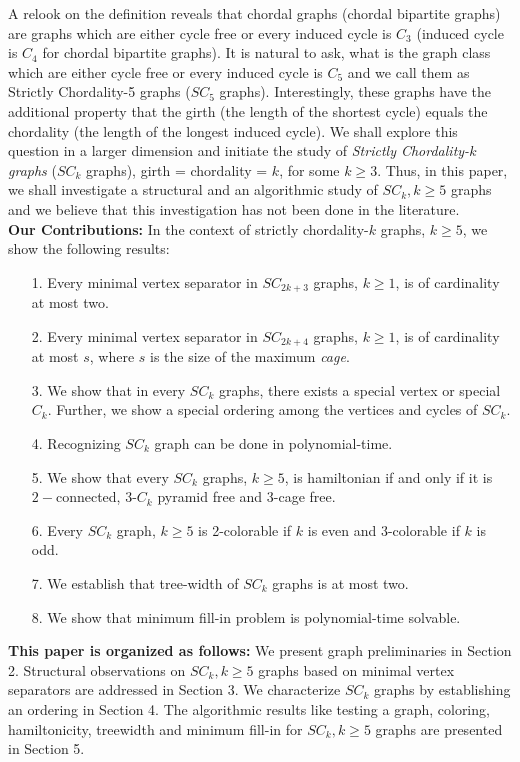 \documentclass[runningheads]{llncs}
\begin{document}
A relook on the definition reveals that chordal graphs (chordal bipartite graphs) are graphs which are either cycle free or every induced cycle is $C_3$ (induced cycle is $C_4$ for chordal bipartite graphs). It is natural to ask, what is the graph class which are either cycle free or every induced cycle is $C_5$ and we call them as Strictly Chordality-5 graphs ($SC_5$ graphs). Interestingly, these graphs have the additional property that the girth (the length of the shortest cycle) equals the chordality (the length of the longest induced cycle). We shall explore this question in a larger dimension and initiate the study of \emph{Strictly Chordality-$k$ graphs} ($SC_k$ graphs), girth = chordality = $k$, for some $k \geq 3$. Thus, in this paper, we shall investigate a structural and an algorithmic study of $SC_k, k \geq 5$ graphs and we believe that this investigation has not been done in the literature.\\
\textbf{Our Contributions:} In the context of strictly chordality-$k$ graphs, $k \geq 5$, we show the following results: 
\begin{itemize}
\item[1.] Every minimal vertex separator in $SC_{2k+3}$ graphs, $k\geq 1$, is of cardinality at most two.
\item[2.] Every minimal vertex separator in $SC_{2k+4}$ graphs, $k\geq 1$, is of cardinality at most $s$, where $s$ is the size of the maximum \emph{cage}. 
\item[3.] We show that in every $SC_k$ graphs, there exists a special vertex or special $C_k$. Further, we show a special ordering among the vertices and cycles of $SC_k$.
\item[4.] Recognizing $SC_k$ graph can be done in polynomial-time.
\item[5.] We show that every $SC_k$ graphs, $k \geq 5$, is hamiltonian if and only if it is $2-$connected, $3$-$C_k$ pyramid free and $3$-cage free.
\item[6.] Every $SC_k$ graph, $k \geq 5$ is 2-colorable if $k$ is even and 3-colorable if $k$ is odd.
\item[7.] We establish that tree-width of $SC_k$ graphs is at most two.
\item[8.] We show that minimum fill-in problem is polynomial-time solvable.
\end{itemize}
\textbf{This paper is organized as follows:} We present graph preliminaries in Section 2. Structural observations on $SC_k, k \geq 5$ graphs based on minimal vertex separators are addressed in Section 3. We characterize $SC_k$ graphs by establishing an ordering in Section 4.  The algorithmic results like testing a graph, coloring, hamiltonicity, treewidth and minimum fill-in for $SC_k, k \geq 5$ graphs are presented in Section 5.
\end{document}
